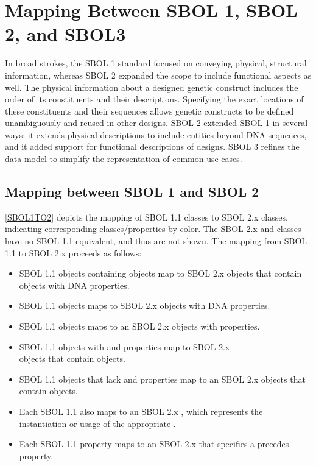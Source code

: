 \section{Mapping Between SBOL 1, SBOL 2, and SBOL3}
\label{sec:mapping}

In broad strokes, the SBOL 1 standard focused on conveying physical, structural information, whereas SBOL 2 expanded the scope to include functional aspects as well.  
The physical information about a designed genetic construct includes the order of its constituents and their descriptions. 
Specifying the exact locations of these constituents and their sequences allows genetic constructs to be defined unambiguously and reused in other designs. 
SBOL 2 extended SBOL 1 in several ways: it extends physical descriptions to include entities beyond DNA sequences, and it added support for functional descriptions of designs.  
SBOL 3 refines the data model to simplify the representation of common use cases.

\subsection{Mapping between SBOL 1 and SBOL 2}

\ref{SBOL1TO2} depicts the mapping of SBOL 1.1 classes to SBOL 2.x classes, indicating corresponding classes/properties by color.
The SBOL 2.x  and  classes have no SBOL 1.1 equivalent, and thus are not shown.
The mapping from SBOL 1.1 to SBOL 2.x proceeds as follows:
\begin{itemize}
\item SBOL 1.1  objects containing  objects map to SBOL 2.x  objects that contain  objects with DNA  properties.
\item SBOL 1.1  objects maps to SBOL 2.x  objects with DNA  properties.
\item SBOL 1.1  objects maps to an SBOL 2.x  objects with   properties.
\item SBOL 1.1  objects with  and  properties map to SBOL 2.x\\
 objects that contain  objects.
\item SBOL 1.1  objects that lack  and  properties map to an SBOL 2.x  objects that contain  objects.
\item Each SBOL 1.1  also maps to an SBOL 2.x , which represents the instantiation or usage of the appropriate .
\item Each SBOL 1.1  property maps to an SBOL 2.x  that specifies a precedes  property.
\end{itemize}

